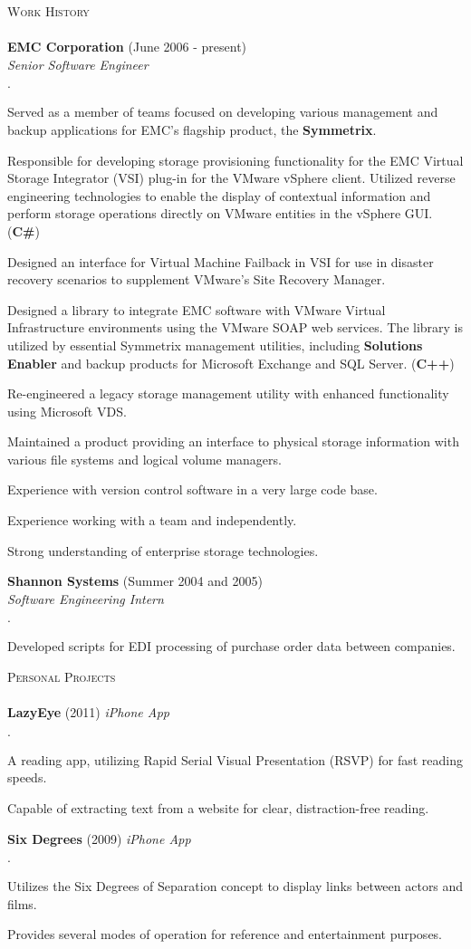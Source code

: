 \documentclass[11pt]{article}
\newcommand{\mydot}{$\cdot$ }
\newcommand{\lineunder}{\vspace*{-8pt} \\ \hspace*{-18pt} \hrulefill \\}
\newcommand{\header}[1]{{\hspace*{-15pt}\vspace*{6pt} \textsc{#1}} \vspace*{-6pt} \lineunder}
\newcommand{\employer}[3]{\textbf{#1} (#2)\\ \emph{#3}\\  }
\newcommand{\project}[3]{\textbf{#1} (#2) \emph{#3}\\  }
\newenvironment{achievements}{\begin{list}{\mydot}{\topsep 0pt \itemsep -2pt}}{\vspace*{4pt}\end{list}}
\begin{document}
\header{Work History}
\employer{EMC Corporation}{June 2006 - present}{Senior Software Engineer}
\begin{achievements}
  \item Served as a member of teams focused on developing various management and backup applications for EMC's flagship product, the \textbf{Symmetrix}.
  \item Responsible for developing storage provisioning functionality for the EMC Virtual Storage Integrator (VSI) plug-in for the VMware vSphere client.  Utilized reverse engineering technologies to enable the display of contextual information and perform storage operations directly on VMware entities in the vSphere GUI. (\textbf{C\#})
  \item Designed an interface for Virtual Machine Failback in VSI for use in disaster recovery scenarios to supplement VMware's Site Recovery Manager.
  \item Designed a library to integrate EMC software with VMware Virtual Infrastructure environments using the VMware SOAP web services.  The library is utilized by essential Symmetrix management utilities, including \textbf{Solutions Enabler} and backup products for Microsoft Exchange and SQL Server. (\textbf{C++})
  \item Re-engineered a legacy storage management utility with enhanced functionality using Microsoft VDS.
  \item Maintained a product providing an interface to physical storage information with various file systems and logical volume managers.
  \item Experience with version control software in a very large code base.
  \item Experience working with a team and independently.
  \item Strong understanding of enterprise storage technologies.
\end{achievements}

\employer{Shannon Systems}{Summer 2004 and 2005}{Software Engineering Intern}
\begin{achievements}
  \item Developed scripts for EDI processing of purchase order data between companies.
\end{achievements}


\header{Personal Projects}
\project{LazyEye}{2011}{iPhone App}{
\begin{achievements}
  \item A reading app, utilizing Rapid Serial Visual Presentation (RSVP) for fast reading speeds.
  \item Capable of extracting text from a website for clear, distraction-free reading.
\end{achievements}}
\project{Six Degrees}{2009}{iPhone App}{
\begin{achievements}
  \item Utilizes the Six Degrees of Separation concept to display links between actors and films.
  \item Provides several modes of operation for reference and entertainment purposes.
\end{achievements}}
\end{document}
